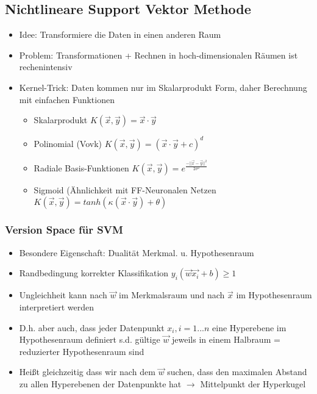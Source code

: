 \documentclass[paper=a4, fontsize=11pt]{scrartcl} %
\numberwithin{equation}{section} %
\numberwithin{figure}{section} %
\numberwithin{table}{section} %
\begin{document}
\subsection{Nichtlineare Support Vektor Methode}

\begin{itemize}
\item Idee: Transformiere die Daten in einen anderen Raum
\item Problem: Transformationen + Rechnen in hoch-dimensionalen Räumen ist rechenintensiv
\item Kernel-Trick: Daten kommen nur im Skalarprodukt Form, daher Berechnung mit einfachen Funktionen
\begin{itemize}
\item Skalarprodukt $K(\vec{x},\vec{y}) = \vec{x} \cdot \vec{y}$
\item Polinomial (Vovk) $K(\vec{x},\vec{y}) =  (\vec{x} \cdot \vec{y} + c)^d$
\item Radiale Basis-Funktionen $K(\vec{x},\vec{y}) = e^{\frac{-||\vec{x}-\vec{y}||^2}{2 \sigma^2}}$
\item Sigmoid (Ähnlichkeit mit FF-Neuronalen Netzen $K(\vec{x},\vec{y}) = tanh(\kappa(\vec{x} \cdot \vec{y}) + \theta)$
\end{itemize}
\end{itemize}

\subsubsection{Version Space für SVM}

\begin{itemize}
\item Besondere Eigenschaft: Dualität Merkmal. u. Hypothesenraum
\item Randbedingung korrekter Klassifikation $y_i(\vec{w} \vec{x_i} + b) \ge 1$
\item Ungleichheit kann nach $\vec{w}$ im Merkmalsraum und nach $\vec{x}$ im Hypothesenraum interpretiert werden
\item D.h. aber auch, dass jeder Datenpunkt $x_i, i=1...n$ eine Hyperebene im Hypothesenraum definiert s.d. gültige $\vec{w}$ jeweils in einem Halbraum = reduzierter Hypothesenraum sind
\item Heißt gleichzeitig dass wir nach dem $\vec{w}$ suchen, dass den maximalen Abstand zu allen Hyperebenen der Datenpunkte hat $\rightarrow$ Mittelpunkt der Hyperkugel
\end{itemize}
\end{document}
